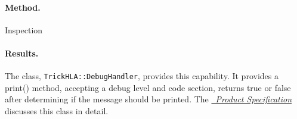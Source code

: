 \paragraph{Method.} Inspection
\paragraph{Results.}
The class, {\tt TrickHLA::DebugHandler}, provides this capability. It provides a
print() method, accepting a debug level and code section, returns true
or false after determining if the message should be printed.
The \href{file:TrickHLASpec.pdf} {\em \TrickHLA\ Product Specification}
discusses this class in detail.
